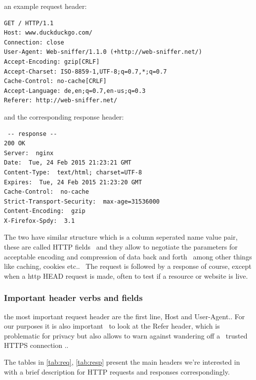\documentclass[a4paper,12pt]{paper}
\begin{document}
an example request header:

\begin{verbatim}
GET / HTTP/1.1
Host: www.duckduckgo.com/
Connection: close
User-Agent: Web-sniffer/1.1.0 (+http://web-sniffer.net/)
Accept-Encoding: gzip[CRLF]
Accept-Charset: ISO-8859-1,UTF-8;q=0.7,*;q=0.7
Cache-Control: no-cache[CRLF]
Accept-Language: de,en;q=0.7,en-us;q=0.3
Referer: http://web-sniffer.net/
\end{verbatim}

and the corresponding response header:

\begin{verbatim}
 -- response --
200 OK
Server:  nginx
Date:  Tue, 24 Feb 2015 21:23:21 GMT
Content-Type:  text/html; charset=UTF-8
Expires:  Tue, 24 Feb 2015 21:23:20 GMT
Cache-Control:  no-cache
Strict-Transport-Security:  max-age=31536000
Content-Encoding:  gzip
X-Firefox-Spdy:  3.1
\end{verbatim}

The two have similar structure which is a column seperated name value pair, these are called HTTP fields \
and they allow to negotiate the parameters for acceptable encoding and compression of data back and forth \
among other things like caching, cookies etc.. \
The request is followed by a response of course, except when a http HEAD request is made, often to test if a resource or website is live.\\

\subsubsection{Important header verbs and fields}

the most important request header are the first line, Host and User-Agent.. For our purposes it is also important \
to look at the Refer header, which is problematic for privacy but also allows to warn against wandering off a \
trusted HTTPS connection ..\

The tables in \ref{tab:req}, \ref{tab:resp} present the main headers we're interested in with a brief description for HTTP requests and responses correspondingly.\
\end{document}
